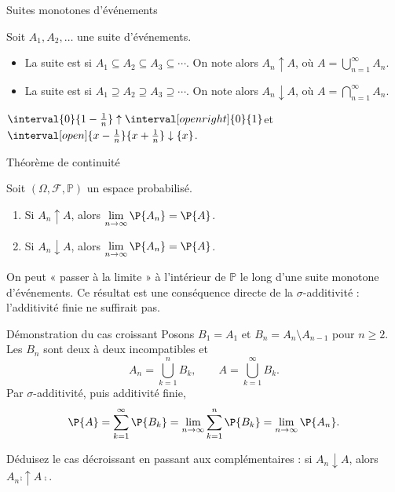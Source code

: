\documentclass[nuit,charter,pied]{BeamerJS}
\newcommand{\tribu}{\mathcal{F}}
\begin{document}
\begin{frame}[t]{Suites monotones d'événements}
\pause
	\begin{defns}
		Soit \(A_1,A_2,\ldots\) une suite d'événements.
		\begin{itemize}
			\item La suite est  si \(A_1\subseteq A_2\subseteq A_3\subseteq\cdots\). On note alors \(A_n\uparrow A\), où \(A=\bigcup_{n=1}^{\infty}A_n\).\pause
			\item La suite est  si \(A_1\supseteq A_2\supseteq A_3\supseteq\cdots\). On note alors \(A_n\downarrow A\), où \(A=\bigcap_{n=1}^{\infty}A_n\).
		\end{itemize}
	\end{defns}
	\pause
	\begin{exs}
		\(\interval{0}{1-\frac{1}{n}}\uparrow\interval[open right]{0}{1}\)\qquad et \qquad\(\interval[open]{x-\frac{1}{n}}{x+\frac{1}{n}}\downarrow\{x\}\).
	\end{exs}
\end{frame}

\begin{frame}[t]{Théorème de continuité}
\pause
	\begin{thm}
		Soit \((\Omega,\tribu,\mathbb{P})\) un espace probabilisé.
		\begin{enumerate}
			\item Si \(A_n\uparrow A\), alors \(\displaystyle\lim_{n\to\infty}\P{A_n}=\P{A}\).\pause
			\item Si \(A_n\downarrow A\), alors \(\displaystyle\lim_{n\to\infty}\P{A_n}=\P{A}\).
		\end{enumerate}
	\end{thm}
	\pause
	\begin{lumiere}
		On peut « passer à la limite » à l'intérieur de \(\mathbb{P}\) le long d'une suite monotone d'événements. Ce résultat est une conséquence directe de la \(\sigma\)-additivité : l'additivité finie ne suffirait pas.
	\end{lumiere}
\end{frame}

\begin{frame}[t]{Démonstration du cas croissant}
\pause
	Posons \(B_1=A_1\) et \(B_n=A_n\setminus A_{n-1}\) pour \(n\geq 2\). \pause Les \(B_n\) sont deux à deux incompatibles et
	\[A_n=\bigcup_{k=1}^{n}B_k,\qquad A=\bigcup_{k=1}^{\infty}B_k.\]
	\pause
	Par \(\sigma\)-additivité, puis additivité finie,
	\[\P{A}=\sum_{k=1}^{\infty}\P{B_k}=\lim_{n\to\infty}\sum_{k=1}^{n}\P{B_k}=\lim_{n\to\infty}\P{A_n}.\]
	\pause
	\begin{cadre}
		Déduisez le cas décroissant en passant aux complémentaires : si \(A_n\downarrow A\), alors \(A_n\comp\uparrow A\comp\).
	\end{cadre}
\end{frame}
\end{document}
